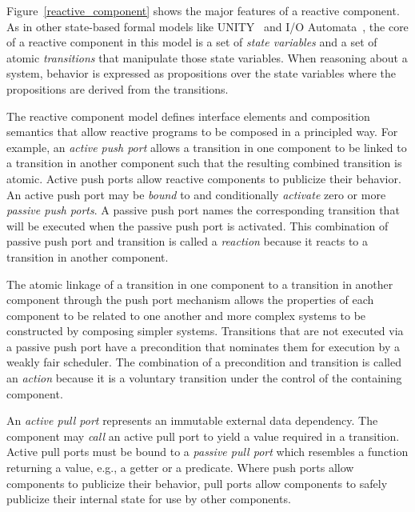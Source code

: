 Figure~\ref{reactive_component} shows the major features of a reactive component.
As in other state-based formal models like UNITY~\cite{chandy1989parallel} and I/O Automata~\cite{nancy1996distributed}, the core of a reactive component in this model is a set of \emph{state variables} and a set of atomic \emph{transitions} that manipulate those state variables.
When reasoning about a system, behavior is expressed as propositions over the state variables where the propositions are derived from the transitions.


The reactive component model defines interface elements and composition semantics that allow reactive programs to be composed in a principled way.
For example, an \emph{active push port} allows a transition in one component to be linked to a transition in another component such that the resulting combined transition is atomic.
Active push ports allow reactive components to publicize their behavior.
An active push port may be \emph{bound} to and conditionally \emph{activate} zero or more \emph{passive push ports}.
A passive push port names the corresponding transition that will be executed when the passive push port is activated.
This combination of passive push port and transition is called a \emph{reaction} because it reacts to a transition in another component.

The atomic linkage of a transition in one component to a transition in another component through the push port mechanism allows the properties of each component to be related to one another and more complex systems to be constructed by composing simpler systems.
Transitions that are not executed via a passive push port have a precondition that nominates them for execution by a weakly fair scheduler.
The combination of a precondition and transition is called an \emph{action} because it is a voluntary transition under the control of the containing component.

An \emph{active pull port} represents an immutable external data dependency.
The component may \emph{call} an active pull port to yield a value required in a transition.
Active pull ports must be bound to a \emph{passive pull port} which resembles a function returning a value, e.g., a getter or a predicate.
Where push ports allow components to publicize their behavior, pull ports allow components to safely publicize their internal state for use by other components.

